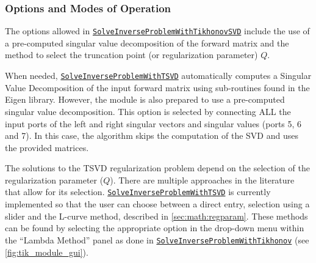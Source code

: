     
    \subsubsection{Options and Modes of Operation}
    
    The options allowed in \href{http://scirundocwiki.sci.utah.edu/SCIRunDocs/index.php5/CIBC:Documentation:SCIRun:Reference:BioPSE:SolveInverseProblemWithTikhonovSVD}{{\tt SolveInverseProblemWithTikhonovSVD}} include the use of a pre-computed singular value decomposition of the forward matrix and the method to select the truncation point (or regularization parameter) $Q$.
    
    
    When needed, \href{http://scirundocwiki.sci.utah.edu/SCIRunDocs/index.php5/CIBC:Documentation:SCIRun:Reference:BioPSE:SolveInverseProblemWithTSVD}{{\tt SolveInverseProblemWithTSVD}} automatically computes a Singular Value Decomposition of the input forward matrix using sub-routines found in the Eigen library.
    However, the module is also prepared to use a pre-computed singular value decomposition. 
    This option is selected by connecting ALL the input ports of the left and right singular vectors and singular values (ports 5, 6 and 7).
    In this case, the algorithm skips the computation of the SVD and uses the provided matrices.
    
    
    The solutions to the TSVD regularization problem depend on the selection of the regularization parameter ($Q$).
    There are multiple approaches in the literature that allow for its selection.
    \href{http://scirundocwiki.sci.utah.edu/SCIRunDocs/index.php5/CIBC:Documentation:SCIRun:Reference:BioPSE:SolveInverseProblemWithTSVD}{{\tt SolveInverseProblemWithTSVD}} is currently implemented so that the user can choose between a direct entry, selection using a slider and the L-curve method, described in \autoref{sec:math:regparam}.
    These methods can be found by selecting the appropriate option in the drop-down menu within the ``Lambda Method'' panel as done in \href{http://scirundocwiki.sci.utah.edu/SCIRunDocs/index.php/CIBC:Documentation:SCIRun:Reference:BioPSE:SolveInverseProblemWithTikhonov}{{\tt SolveInverseProblemWithTikhonov}} (see \autoref{fig:tik_module_gui}).


